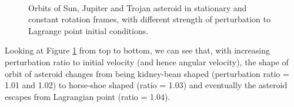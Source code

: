 \documentclass[12pt,a4paper]{article}
\begin{document}
\begin{figure}[H]
 \\

\caption{Orbits of Sun, Jupiter and Trojan asteroid in stationary and constant rotation frames, with different strength of perturbation to Lagrange point initial conditions.}
\label{fig:bigchart}
\end{figure}

Looking at Figure \ref{fig:bigchart} from top to bottom, we can see that, with increasing perturbation ratio to initial velocity (and hence angular velocity), the shape of orbit of asteroid changes from being kidney-bean shaped (perturbation ratio = 1.01 and 1.02) to horse-shoe shaped (ratio = 1.03) and eventually the asteroid escapes from Lagrangian point (ratio = 1.04).
\end{document}
